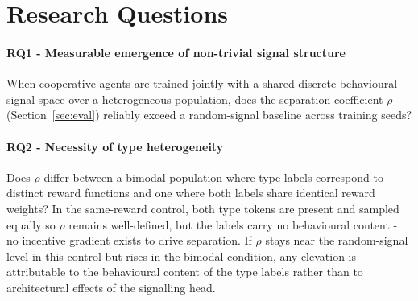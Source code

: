 \documentclass[12pt,a4paper]{article}
\begin{document}
%


\section{Research Questions}

\paragraph{RQ1 - Measurable emergence of non-trivial signal structure}
When cooperative agents are trained jointly with a shared discrete behavioural signal space over
a heterogeneous population, does the separation coefficient $\rho$ (Section~\ref{sec:eval})
reliably exceed a random-signal baseline across training seeds?

\paragraph{RQ2 - Necessity of type heterogeneity}
Does $\rho$ differ between a bimodal population where type labels correspond to distinct reward
functions and one where both labels share identical reward weights? In the same-reward control,
both type tokens are present and sampled equally so $\rho$ remains well-defined, but the labels
carry no behavioural content - no incentive gradient exists to drive separation. If $\rho$ stays
near the random-signal level in this control but rises in the bimodal condition, any elevation is
attributable to the behavioural content of the type labels rather than to architectural effects of
the signalling head.
\end{document}

